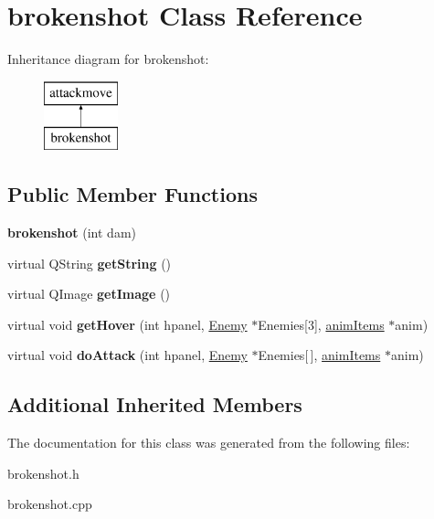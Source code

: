 \hypertarget{classbrokenshot}{\section{brokenshot Class Reference}
\label{classbrokenshot}
}
Inheritance diagram for brokenshot\-:\begin{figure}[H]
\begin{center}
\leavevmode
\includegraphics[height=2.000000cm]{classbrokenshot}
\end{center}
\end{figure}
\subsection*{Public Member Functions}
\begin{DoxyCompactItemize}
\item 
\hypertarget{classbrokenshot_aef0d22efead95c42a51a76293cfd91ae}{{\bfseries brokenshot} (int dam)}\label{classbrokenshot_aef0d22efead95c42a51a76293cfd91ae}

\item 
\hypertarget{classbrokenshot_a4834069bb57b3bb17a4816888cc83e43}{virtual Q\-String {\bfseries get\-String} ()}\label{classbrokenshot_a4834069bb57b3bb17a4816888cc83e43}

\item 
\hypertarget{classbrokenshot_ab5a534dcbeb99a57362e22bd11598a27}{virtual Q\-Image {\bfseries get\-Image} ()}\label{classbrokenshot_ab5a534dcbeb99a57362e22bd11598a27}

\item 
\hypertarget{classbrokenshot_a1d9aaa51c4a27d8bb68a8f0678430d3a}{virtual void {\bfseries get\-Hover} (int hpanel, \hyperlink{class_enemy}{Enemy} $\ast$Enemies\mbox{[}3\mbox{]}, \hyperlink{classanim_items}{anim\-Items} $\ast$anim)}\label{classbrokenshot_a1d9aaa51c4a27d8bb68a8f0678430d3a}

\item 
\hypertarget{classbrokenshot_a22b66a06882a1e1761fd796c7548cf50}{virtual void {\bfseries do\-Attack} (int hpanel, \hyperlink{class_enemy}{Enemy} $\ast$Enemies\mbox{[}$\,$\mbox{]}, \hyperlink{classanim_items}{anim\-Items} $\ast$anim)}\label{classbrokenshot_a22b66a06882a1e1761fd796c7548cf50}

\end{DoxyCompactItemize}
\subsection*{Additional Inherited Members}


The documentation for this class was generated from the following files\-:\begin{DoxyCompactItemize}
\item 
brokenshot.\-h\item 
brokenshot.\-cpp\end{DoxyCompactItemize}
